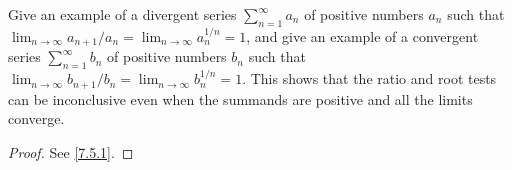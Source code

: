 \begin{exercise}\label{ex 7.5.3}
  Give an example of a divergent series \(\sum_{n = 1}^\infty a_n\) of positive numbers \(a_n\) such that \(\lim_{n \to \infty} a_{n + 1} / a_n = \lim_{n \to \infty} a_n^{1 / n} = 1\), and give an example of a convergent series \(\sum_{n = 1}^\infty b_n\) of positive numbers \(b_n\) such that \(\lim_{n \to \infty} b_{n + 1} / b_n = \lim_{n \to \infty} b_n^{1 / n} = 1\).
  This shows that the ratio and root tests can be inconclusive even when the summands are positive and all the limits converge.
\end{exercise}

\begin{proof}
  See \cref{7.5.1}.
\end{proof}